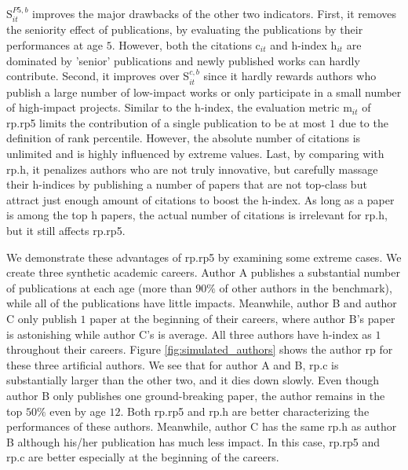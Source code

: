S$_{it}^{P5,b}$ improves the major drawbacks of the other two indicators. First, it removes the seniority effect of publications, by evaluating the publications by their performances at age $5$. However, both the citations c$_{it}$ and h-index h$_{it}$ are dominated by 'senior' publications and newly published works can hardly contribute. Second, it improves over S$_{it}^{c,b}$ since it hardly rewards authors who publish a large number of low-impact works or only participate in a small number of high-impact projects. Similar to the h-index, the evaluation metric m$_{it}$ of rp.rp5 limits the contribution of a single publication to be at most $1$ due to the definition of rank percentile. However, the absolute number of citations is unlimited and is highly influenced by extreme values. Last, by comparing with rp.h, it penalizes authors who are not truly innovative, but carefully massage their h-indices by publishing a number of papers that are not top-class but attract just enough amount of citations to boost the h-index. As long as a paper is among the top h papers, the actual number of citations is irrelevant for rp.h, but it still affects rp.rp5.

We demonstrate these advantages of rp.rp5 by examining some extreme cases. We create three synthetic academic careers. Author A publishes a substantial number of publications at each age (more than $90\%$ of other authors in the benchmark), while all of the publications have little impacts. Meanwhile, author B and author C only publish $1$ paper at the beginning of their careers, where author B's paper is astonishing while author C's is average. All three authors have h-index as $1$ throughout their careers. Figure \ref{fig:simulated_authors} shows the author rp for these three artificial authors. We see that for author A and B, rp.c is substantially larger than the other two, and it dies down slowly. Even though author B only publishes one ground-breaking paper, the author remains in the top $50\%$ even by age $12$. Both rp.rp5 and rp.h are better characterizing the performances of these authors. Meanwhile, author C has the same rp.h as author B although his/her publication has much less impact. In this case, rp.rp5 and rp.c are better especially at the beginning of the careers. 

